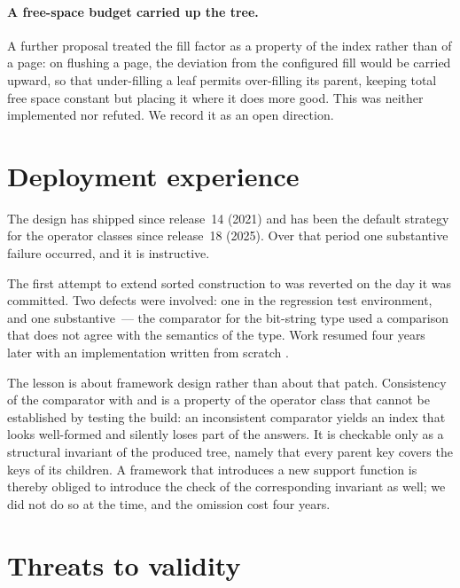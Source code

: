 \paragraph{A free-space budget carried up the tree.} A further proposal treated
the fill factor as a property of the index rather than of a page: on flushing a
page, the deviation from the configured fill would be carried upward, so that
under-filling a leaf permits over-filling its parent, keeping total free space
constant but placing it where it does more good. This was neither implemented nor
refuted. We record it as an open direction.

\section{Deployment experience}
\label{sec:deployment}

The design has shipped since release~14 (2021) and has been the default strategy
for the  operator classes since release~18 (2025). Over that
period one substantive failure occurred, and it is instructive.

The first attempt to extend sorted construction to  was
reverted on the day it was committed. Two defects were involved: one in the
regression test environment, and one substantive~--- the comparator for the
bit-string type used a comparison that does not agree with the semantics of the
type. Work resumed four years later with an implementation written from scratch
\cite{thread-btree-gist-sort}.

The lesson is about framework design rather than about that patch. Consistency
of the comparator with  and  is a property of the
operator class that cannot be established by testing the build: an inconsistent
comparator yields an index that looks well-formed and silently loses part of the
answers. It is checkable only as a structural invariant of the produced tree,
namely that every parent key covers the keys of its children. A framework that
introduces a new support function is thereby obliged to introduce the check of
the corresponding invariant as well; we did not do so at the time, and the
omission cost four years.

\section{Threats to validity}
\label{sec:threats}

